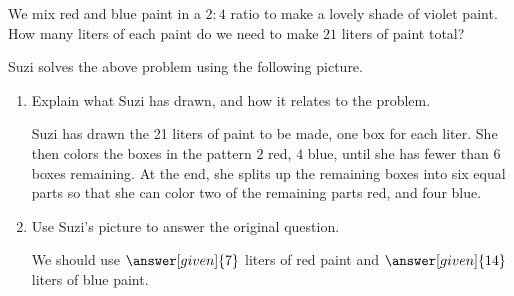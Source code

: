 \documentclass[nooutcomes]{ximera}
\begin{document}
\begin{problem}
We mix red and blue paint in a $2 : 4$ ratio to make a lovely shade of violet paint.  How many liters of each paint do we need to make $21$ liters of paint total? 

Suzi solves the above problem using the following picture.

\begin{center}
\end{center}

\begin{enumerate}
\item Explain what Suzi has drawn, and how it relates to the problem.
\begin{freeResponse}
\begin{hint}
Suzi has drawn the 21 liters of paint to be made, one box for each liter.  She then colors the boxes in the pattern $2$ red, $4$ blue, until she has fewer than 6 boxes remaining.  At the end, she splits up the remaining boxes into six equal parts so that she can color two of the remaining parts red, and four blue.
\end{hint}
\end{freeResponse}
\item Use Suzi's picture to answer the original question.
\begin{prompt}
We should use $\answer[given]{7}$ liters of red paint and $\answer[given]{14}$ liters of blue paint.
\end{prompt}
\end{enumerate}

\end{problem}
\end{document}
